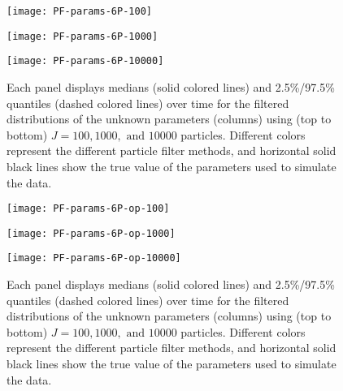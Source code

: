 \documentclass{article}
\begin{document}
\begin{figure}[ht]
\centering
\begin{minipage}{1.1\linewidth}
\texttt{[image: PF-params-6P-100]}
\end{minipage}
\begin{minipage}{1.1\linewidth}
\texttt{[image: PF-params-6P-1000]}
\end{minipage}
\begin{minipage}{1.1\linewidth}
\texttt{[image: PF-params-6P-10000]}
\end{minipage}
\caption{Each panel displays medians (solid colored lines) and 2.5\%/97.5\% quantiles (dashed colored lines) over time for the filtered distributions of the unknown parameters (columns) using (top to bottom) $J = 100, 1000, \mbox{ and } 10000$ particles.  Different colors represent the different particle filter methods, and horizontal solid black lines show the true value of the parameters used to simulate the data.} \label{fig:params6P}
\end{figure}

\begin{figure}[ht]
\centering
\begin{minipage}{1.1\linewidth}
\texttt{[image: PF-params-6P-op-100]}
\end{minipage}
\begin{minipage}{1.1\linewidth}
\texttt{[image: PF-params-6P-op-1000]}
\end{minipage}
\begin{minipage}{1.1\linewidth}
\texttt{[image: PF-params-6P-op-10000]}
\end{minipage}
\caption{Each panel displays medians (solid colored lines) and 2.5\%/97.5\% quantiles (dashed colored lines) over time for the filtered distributions of the unknown parameters (columns) using (top to bottom) $J = 100, 1000, \mbox{ and } 10000$ particles.  Different colors represent the different particle filter methods, and horizontal solid black lines show the true value of the parameters used to simulate the data.} \label{fig:params6Pop}
\end{figure}
\end{document}
